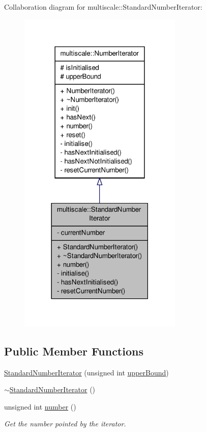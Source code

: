 Collaboration diagram for multiscale\-:\-:Standard\-Number\-Iterator\-:
\nopagebreak
\begin{figure}[H]
\begin{center}
\leavevmode
\includegraphics[width=222pt]{classmultiscale_1_1StandardNumberIterator__coll__graph}
\end{center}
\end{figure}
\subsection*{Public Member Functions}
\begin{DoxyCompactItemize}
\item 
\hyperlink{classmultiscale_1_1StandardNumberIterator_a43b7b42ae0ed44a140cf4817cadf9166}{Standard\-Number\-Iterator} (unsigned int \hyperlink{classmultiscale_1_1NumberIterator_a56a5558958778bbde64e249d67cba886}{upper\-Bound})
\item 
\hyperlink{classmultiscale_1_1StandardNumberIterator_aa5b9da824bd014eebab86462f7d08219}{$\sim$\-Standard\-Number\-Iterator} ()
\item 
unsigned int \hyperlink{classmultiscale_1_1StandardNumberIterator_a9071fcd0f94b3520a76ed22faed97353}{number} ()
\begin{DoxyCompactList}\small\item\em Get the number pointed by the iterator. \end{DoxyCompactList}\end{DoxyCompactItemize}
